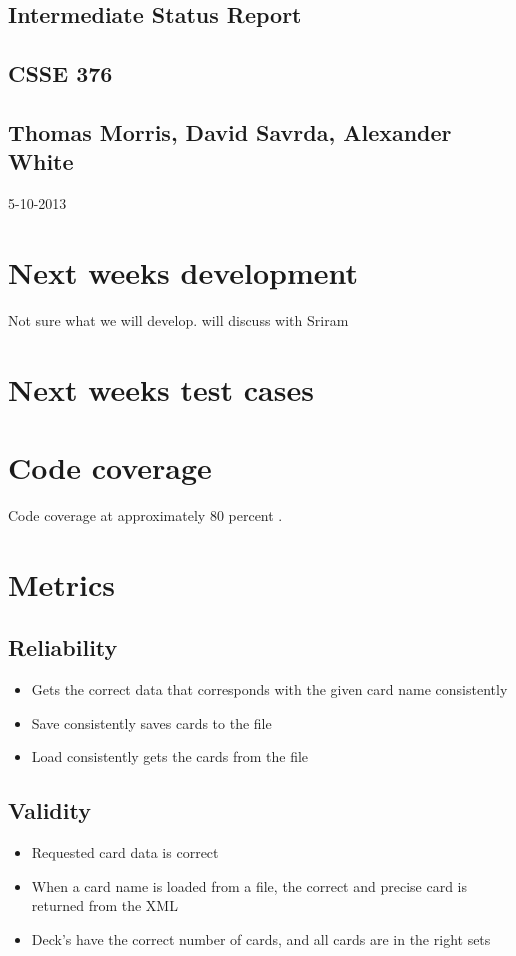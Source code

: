 \documentclass{article}
\begin{document}
	\begin{titlepage}
		\vspace*{\fill}
		\hrulefill
		\begin{center}
			\section*{Intermediate Status Report}
			\subsection*{CSSE 376}
			\subsection*{Thomas Morris, David Savrda, Alexander White}
			5-10-2013
		\end{center}
		\hrulefill
		\vspace*{\fill}
	\end{titlepage}
	\newpage
	\section*{Next weeks development}
		Not sure what we will develop. will discuss with Sriram 
	\section*{Next weeks test cases}
	\section*{Code coverage}
		Code coverage at approximately 80 percent .
	\section*{Metrics}
		\subsection*{Reliability}
			\begin{itemize}
				\item Gets the correct data that corresponds with the given card name consistently
				\item Save consistently saves cards to the file
				\item Load consistently gets the cards from the file
			\end{itemize}
		\subsection*{Validity}
			\begin{itemize}
				\item Requested card data is correct
				\item When a card name is loaded from a file, the correct and precise card is returned from the XML
				\item Deck's have the correct number of cards, and all cards are in the right sets
			\end{itemize}
\end{document}
